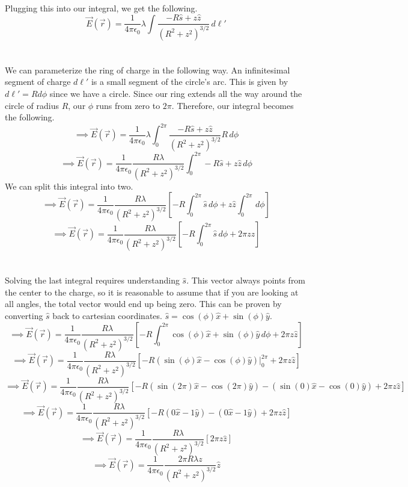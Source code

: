 \documentclass[12pt]{article}
\begin{document}
\begin{flushleft}
Plugging this into our integral, we get the following.
$$\vec{E}(\vec{r})=\frac{1}{4\pi\epsilon_0}\lambda\int\frac{-R\hat{s}+z\hat{z}}{(R^2+z^2)^{3/2}}\,d\ell'$$\\~\\

We can parameterize the ring of charge in the following way.
An infinitesimal segment of charge $d\ell'$ is a small segment of the circle's arc.
This is given by $d\ell'=Rd\phi$ since we have a circle.
Since our ring extends all the way around the circle of radius $R$, our $\phi$ runs from zero to $2\pi$.
Therefore, our integral becomes the following.
$$\implies\vec{E}(\vec{r})=\frac{1}{4\pi\epsilon_0}\lambda\int_0^{2\pi}\frac{-R\hat{s}+z\hat{z}}{(R^2+z^2)^{3/2}}R\,d\phi$$
$$\implies\vec{E}(\vec{r})=\frac{1}{4\pi\epsilon_0}\frac{R\lambda}{(R^2+z^2)^{3/2}}\int_0^{2\pi}-R\hat{s}+z\hat{z}\,d\phi$$
We can split this integral into two.
$$\implies\vec{E}(\vec{r})=\frac{1}{4\pi\epsilon_0}\frac{R\lambda}{(R^2+z^2)^{3/2}}\left[-R\int_0^{2\pi}\hat{s}\,d\phi+z\hat{z}\int_0^{2\pi}\,d\phi\right]$$
$$\implies\vec{E}(\vec{r})=\frac{1}{4\pi\epsilon_0}\frac{R\lambda}{(R^2+z^2)^{3/2}}\left[-R\int_0^{2\pi}\hat{s}\,d\phi+2\pi z\hat{z}\right]$$\\~\\

Solving the last integral requires understanding $\hat{s}$.
This vector always points from the center to the charge, so it is reasonable to assume that if you are looking at all angles, the total vector would end up being zero.
This can be proven by converting $\hat{s}$ back to cartesian coordinates.
$\hat{s}=\cos(\phi)\hat{x}+\sin(\phi)\hat{y}$.
$$\implies\vec{E}(\vec{r})=\frac{1}{4\pi\epsilon_0}\frac{R\lambda}{(R^2+z^2)^{3/2}}\left[-R\int_0^{2\pi}\cos(\phi)\hat{x}+\sin(\phi)\hat{y}\,d\phi+2\pi z\hat{z}\right]$$
$$\implies\vec{E}(\vec{r})=\frac{1}{4\pi\epsilon_0}\frac{R\lambda}{(R^2+z^2)^{3/2}}\left[-R\left(\sin(\phi)\hat{x}-\cos(\phi)\hat{y}\right)\Big|_0^{2\pi}+2\pi z\hat{z}\right]$$
$$\implies\vec{E}(\vec{r})=\frac{1}{4\pi\epsilon_0}\frac{R\lambda}{(R^2+z^2)^{3/2}}\left[-R\left(\sin(2\pi)\hat{x}-\cos(2\pi)\hat{y}\right)-\left(\sin(0)\hat{x}-\cos(0)\hat{y}\right)+2\pi z\hat{z}\right]$$
$$\implies\vec{E}(\vec{r})=\frac{1}{4\pi\epsilon_0}\frac{R\lambda}{(R^2+z^2)^{3/2}}\left[-R\left(0\hat{x}-1\hat{y}\right)-\left(0\hat{x}-1\hat{y}\right)+2\pi z\hat{z}\right]$$
$$\implies\vec{E}(\vec{r})=\frac{1}{4\pi\epsilon_0}\frac{R\lambda}{(R^2+z^2)^{3/2}}\left[2\pi z\hat{z}\right]$$
$$\implies\vec{E}(\vec{r})=\frac{1}{4\pi\epsilon_0}\frac{2\pi R\lambda z}{(R^2+z^2)^{3/2}}\hat{z}$$


\end{flushleft}
\end{document}
